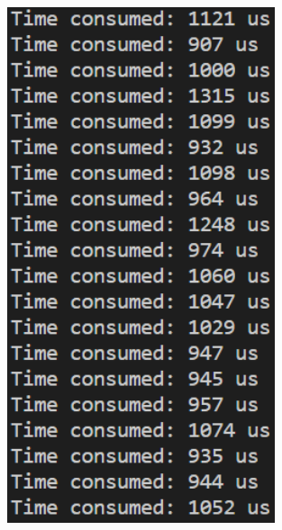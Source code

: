 \documentclass[a4paper,12pt]{article}
\begin{document}
\begin{figure}[H]
{\begin{minipage}[t]{0.4\textwidth}
        \includegraphics[width = 0.7\textwidth]{N = 1600000, Asm optimization.png}
    \end{minipage}}
\end{figure}
\end{document}
